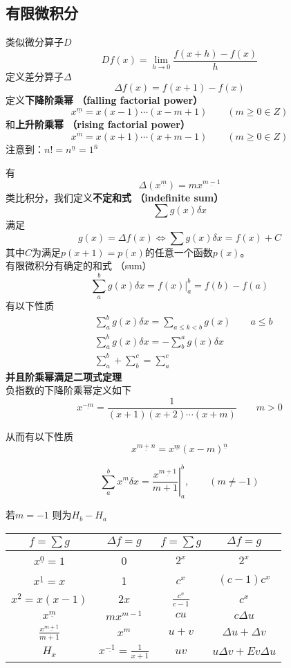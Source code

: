 \documentclass[12pt, a4paper, oneside]{ctexbook}
\begin{document}
\subsection{有限微积分}

类似微分算子$D$
$$
D f(x)=\lim\limits_{h\rightarrow 0}\frac{f(x+h)-f(x)}{h}
$$
定义差分算子$\Delta$
$$
\Delta f(x)= f(x+1)-f(x)
$$
定义\textbf{下降阶乘幂 （falling factorial power）}
$$
x^{\underline{m}}=x(x-1)\cdots(x-m+1)\qquad (m\ge 0 \in Z)
$$
和\textbf{上升阶乘幂 （rising factorial power）}
$$
x^{\overline{m}}=x(x+1)\cdots(x+m-1)\qquad (m\ge 0 \in Z)
$$
注意到：$n!=n^{\underline{n}}=1^{\overline{n}}$

有
$$
\Delta(x^{\underline{m}})=mx^{\underline{m-1}}
$$
类比积分，我们定义\textbf{不定和式 （indefinite sum）}
$$
\sum g(x)\delta x
$$
满足
$$
g(x)=\Delta f(x)\iff \sum g(x)\delta x=f(x)+C
$$
其中$C$为满足$p(x+1)=p(x)$的任意一个函数$p(x)$。\\

有限微积分有确定的和式 （sum）
$$
\sum_a^b g(x)\delta x=f(x)|_a^b=f(b)-f(a)
$$
有以下性质
$$
\begin{aligned}
&\sum_a^b g(x)\delta x= \sum_{a\le k < b} g(x) \qquad a\le b\\
&\sum_a^{b}g(x) \delta x =-\sum_{b}^ag(x)\delta x\\
&\sum_a^b+\sum_b^c=\sum_a^c
\end{aligned}
$$
\textbf{并且阶乘幂满足二项式定理}\\

负指数的下降阶乘幂定义如下
$$
x^{\underline{-m}}= \frac{1}{(x+1)(x+2)\cdots(x+m)} \qquad m>0
$$

从而有以下性质
$$
x^{\underline{m+n}}=x^{\underline{m}}(x-m)^{\underline{n}}
$$

$$
\sum_{a}^{b} x^{\underline{m}}  \delta x=\left. \frac{x^{\underline{m+1}}}{m+1}\right|_a^b, \qquad (m\neq -1)
$$

若$m=-1$ 则为$H_b-H_a$

\begin{tabular}{|c|c|c|c|}
  \hline
  \( f = \sum g \) & \( \Delta f = g \) & \( f = \sum g \) & \( \Delta f = g \) \\
  \hline
  \( x^{\underline{0}} = 1 \)    & 0                & \( 2^x \)        & \( 2^x \)          \\
  \hline
  \( x^{\underline{1}} = x \) & 1                & \( c^x \)        & \( (c - 1)c^x \)   \\
  \hline
  \( x^{\underline{2}} = x(x - 1) \) & \( 2x \)      & \( \frac{c^x}{c - 1} \) & \( c^x \)     \\
  \hline
  \( x^{\underline{m}} \)         & \( mx^{m-1} \)   & \( cu \)         & \( c\Delta u \)    \\
  \hline
  \( \frac{x^{\underline{m+1}}}{m + 1} \) & \( x^m \) & \( u + v \)      & \( \Delta u + \Delta v \) \\
  \hline
  \( H_x \)         & \( x^{\underline{-1}} = \frac{1}{x + 1} \) & \( uv \) & \( u\Delta v + Ev\Delta u \) \\
  \hline
  \end{tabular}
\end{document}
